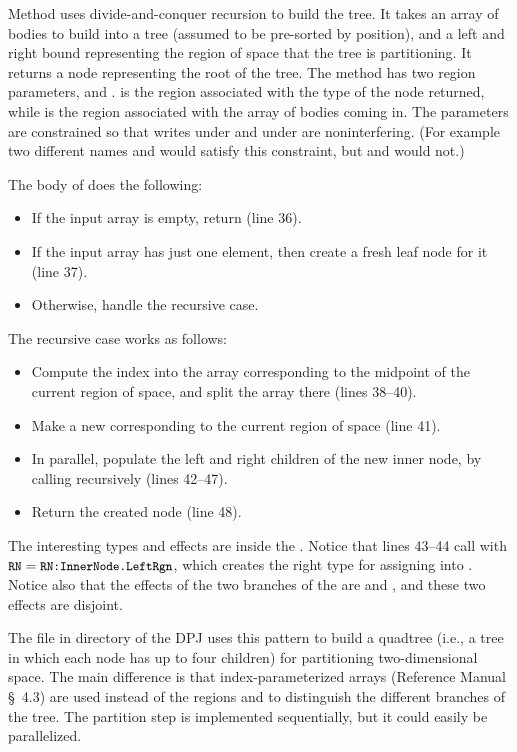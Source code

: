 Method  uses divide-and-conquer recursion to build the
tree.  It takes an array of bodies to build into a tree (assumed to be
pre-sorted by position), and a left and right bound representing the
region of space that the tree is partitioning.  It returns a node
representing the root of the tree.  The method has two region
parameters,  and .   is the region associated
with the type of the node returned, while  is the region
associated with the array of bodies coming in.  The parameters are
constrained so that writes under  and under  are
noninterfering.  (For example two different names  and 
would satisfy this constraint, but  and  would not.)

The body of  does the following:
%
\begin{itemize}
%
\item If the input array is empty, return  (line 36).
%
\item If the input array has just one element, then create a fresh
  leaf node for it (line 37).
%
\item Otherwise, handle the recursive case.
%
\end{itemize}

The recursive case works as follows:
%
\begin{itemize}
%
\item Compute the index into the array corresponding to the midpoint
  of the current region of space, and split the array there (lines
  38--40).
%
\item Make a new  corresponding to the current region
  of space (line 41).
%
\item In parallel, populate the left and right children of the new
  inner node, by calling  recursively (lines 42--47).
%
\item Return the created node (line 48).
%
\end{itemize}

The interesting types and effects are inside the .
Notice that lines 43--44 call  with
$\mbox{\small{\texttt{RN}}}=\mbox{\small{\texttt{RN:InnerNode.LeftRgn}}}$, which creates the right type
for assigning into .  Notice also that the effects
of the two branches of the  are  and , and these two effects are disjoint.

 The file  in directory
 of the DPJ uses this pattern to build a
quadtree (i.e., a tree in which each node has up to four children) for
partitioning two-dimensional space.  The main difference is that
index-parameterized arrays (Reference Manual \S~4.3) are used instead
of the regions  and  to distinguish the
different branches of the tree.  The partition step is implemented
sequentially, but it could easily be parallelized.


